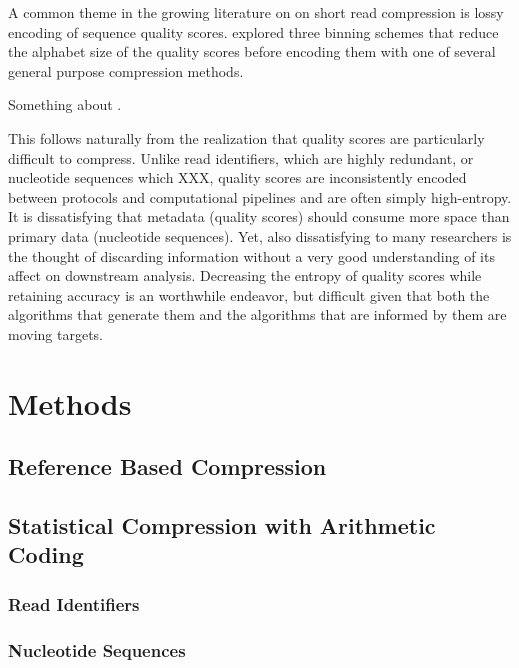 \documentclass[twocolumn]{article}
\begin{document}

A common theme in the growing literature on on short read compression is lossy
encoding of sequence quality scores. \citet{Wan2011} explored three binning
schemes that reduce the alphabet size of the quality scores before encoding
them with one of several general purpose compression methods.

Something about \citet{Hach2012}.






This follows naturally from the realization that quality scores are
particularly difficult to compress. Unlike read identifiers, which are highly
redundant, or nucleotide sequences which XXX, quality scores are
inconsistently encoded between protocols and computational pipelines and are
often simply high-entropy. It is dissatisfying that metadata (quality scores)
should consume more space than primary data (nucleotide sequences). Yet, also
dissatisfying to many researchers is the thought of discarding information
without a very good understanding of its affect on downstream analysis.
Decreasing the entropy of quality scores while retaining accuracy is an
worthwhile endeavor, but difficult given that both the algorithms that
generate them and the algorithms that are informed by them are moving targets.


\section{Methods}

\subsection{Reference Based Compression}

\subsection{Statistical Compression with Arithmetic Coding}

\subsubsection{Read Identifiers}

\subsubsection{Nucleotide Sequences}
\end{document}
